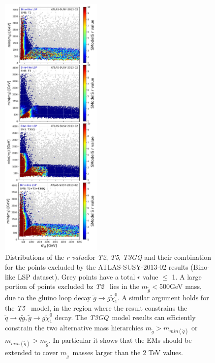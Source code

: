 \documentclass[preprint,number,sort&compress,twocolumn,3p]{elsstyarticle}
\newcommand{\MGLU}{$ m _{ \tilde g } $\xspace}
\newcommand{\RVALUE}{\textit{r value}}
\newcommand{\TGQ}{ \textit{T3GQ}}
\newcommand{\Ttwo}{ \textit{T2}}
\newcommand{\Tfive}{ \textit{T5}}
\begin{document}
\clearpage\begin{figure}[!h]
	\begin{center}
		\includegraphics[width=0.44\textwidth]{PLOTS/App/Grid.png}
	\end{center}
	\vspace{0.2pt}
	\caption{Distributions of the \RVALUE for \textit{T2}, \textit{T5}, \textit{T3GQ} and their combination for the points excluded by the ATLAS-SUSY-2013-02 results (Bino-like LSP dataset). Grey points have a total $r$ value $\leq$ 1. A large portion of points excluded bz \Ttwo~ lies in the $m_{\tilde g}<500 $GeV mass, due to the gluino loop decay $\tilde g \rightarrow g \tilde \chi _1 ^0$. A similar argument holds for the \Tfive~ model, in the region where the result constrains the $\tilde q \rightarrow q \tilde g, \tilde g \rightarrow  g \tilde \chi _1 ^0$ decay. The \TGQ~model results can efficiently constrain the two alternative mass hierarchies $m_{\tilde g}>m_{min(\tilde q)}$ or $m_{min(\tilde q)}>m_{\tilde g }$. In particular it shows that the EMs should be extended to cover \MGLU~masses larger than the 2 TeV values.}
	\label{rvalues-bino}
\end{figure}
\end{document}
